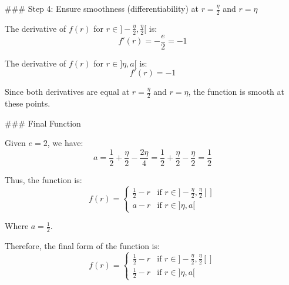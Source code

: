 ### Step 4: Ensure smoothness (differentiability) at \( r = \frac{\eta}{2} \) and \( r = \eta \)

The derivative of \( f(r) \) for \( r \in ]-\frac{\eta}{2}, \frac{\eta}{2}[\) is:
\[ f'(r) = -\frac{e}{2} = -1 \]

The derivative of \( f(r) \) for \( r \in ]\eta, a[\) is:
\[ f'(r) = -1 \]

Since both derivatives are equal at \( r = \frac{\eta}{2} \) and \( r = \eta \), the function is smooth at these points.

### Final Function

Given \( e = 2 \), we have:
\[ a = \frac{1}{2} + \frac{\eta}{2} - \frac{2\eta}{4} = \frac{1}{2} + \frac{\eta}{2} - \frac{\eta}{2} = \frac{1}{2} \]

Thus, the function is:
\[ f(r) = \begin{cases} 
\frac{1}{2} - r & \text{if } r \in ]-\frac{\eta}{2}, \frac{\eta}{2}[] \\
a - r & \text{if } r \in ]\eta, a[
\end{cases} \]

Where \( a = \frac{1}{2} \).

Therefore, the final form of the function is:
\[ f(r) = \begin{cases} 
\frac{1}{2} - r & \text{if } r \in ]-\frac{\eta}{2}, \frac{\eta}{2}[] \\
\frac{1}{2} - r & \text{if } r \in ]\eta, a[
\end{cases} \]